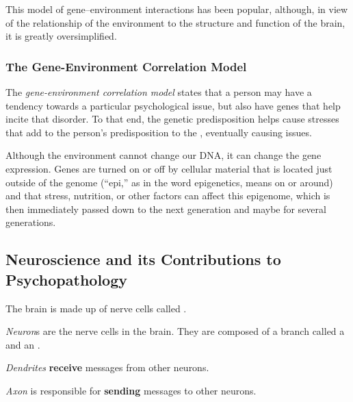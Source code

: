 This model of gene–environment interactions has been popular, although, in view of the relationship of the environment to the structure and function of the brain, it is greatly oversimplified.

\subsubsection{The Gene-Environment Correlation Model}\label{subsubsec:Gene-Environment_Correlation_Model}
\begin{definition}\label{def:Gene-Environment_Correlation_Model}
  The \emph{gene-environment correlation model} states that a person may have a tendency towards a particular psychological issue, but also have genes that help incite that disorder.
  To that end, the genetic predisposition helps cause stresses that add to the person's predisposition to the , eventually causing issues.
\end{definition}

Although the environment cannot change our DNA, it can change the gene expression.
Genes are turned on or off by cellular material that is located just outside of the genome (``epi,'' as in the word epigenetics, means on or around) and that stress, nutrition, or other factors can affect this epigenome, which is then immediately passed down to the next generation and maybe for several generations.

\subsection{Neuroscience and its Contributions to Psychopathology}\label{subsec:Neuroscience_Contributions_Psychopathology}
The brain is made up of nerve cells called .

\begin{definition}[Neuron]\label{def:Neuron}
  \emph{Neuron}s are the nerve cells in the brain.
  They are composed of a branch called a  and an .
\end{definition}

\begin{definition}[Dendrite]\label{def:Dendrite}
  \emph{Dendrites} \textbf{receive} messages from other neurons.
\end{definition}

\begin{definition}[Axon]\label{def:Axon}
  \emph{Axon} is responsible for \textbf{sending} messages to other neurons.
\end{definition}

